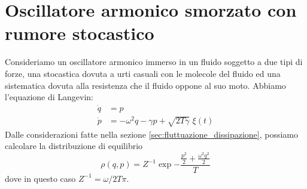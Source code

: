 \documentclass[10pt,a4paper]{article}
\begin{document}
\section{Oscillatore armonico smorzato con rumore stocastico}
Consideriamo un oscillatore armonico immerso in un fluido soggetto a due tipi di forze, una stocastica dovuta a urti casuali con le molecole del fluido ed una sistematica dovuta alla resistenza che il fluido oppone al suo moto. Abbiamo l'equazione di Langevin:
\begin{align}
	\dot{q} &= p\\
	\dot{p} &= -\omega^2 q - \gamma p + \sqrt{2T\gamma}\,\,\xi(t)
\end{align}
Dalle considerazioni fatte nella sezione \ref{sec:fluttuazione_dissipazione}, possiamo calcolare la distribuzione di equilibrio
\begin{equation}
	\rho(q,p) = Z^{-1} \exp{-\frac{\frac{p^2}{2}+\frac{\omega^2q^2}{2}}{T}}
\end{equation}
dove in questo caso \(Z^{-1}=\omega/2T\pi\).
\end{document}
